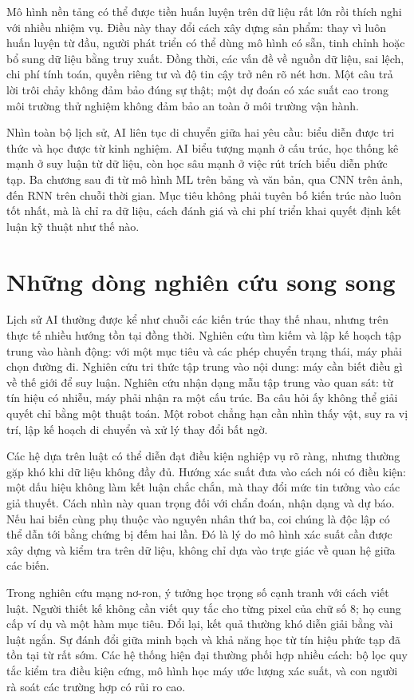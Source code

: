 \documentclass[12pt,a4paper]{report}
\begin{document}
Mô hình nền tảng có thể được tiền huấn luyện trên dữ liệu rất lớn rồi thích nghi với nhiều nhiệm vụ. Điều này thay đổi cách xây dựng sản phẩm: thay vì luôn huấn luyện từ đầu, người phát triển có thể dùng mô hình có sẵn, tinh chỉnh hoặc bổ sung dữ liệu bằng truy xuất. Đồng thời, các vấn đề về nguồn dữ liệu, sai lệch, chi phí tính toán, quyền riêng tư và độ tin cậy trở nên rõ nét hơn. Một câu trả lời trôi chảy không đảm bảo đúng sự thật; một dự đoán có xác suất cao trong môi trường thử nghiệm không đảm bảo an toàn ở môi trường vận hành.

Nhìn toàn bộ lịch sử, AI liên tục di chuyển giữa hai yêu cầu: biểu diễn được tri thức và học được từ kinh nghiệm. AI biểu tượng mạnh ở cấu trúc, học thống kê mạnh ở suy luận từ dữ liệu, còn học sâu mạnh ở việc rút trích biểu diễn phức tạp. Ba chương sau đi từ mô hình ML trên bảng và văn bản, qua CNN trên ảnh, đến RNN trên chuỗi thời gian. Mục tiêu không phải tuyên bố kiến trúc nào luôn tốt nhất, mà là chỉ ra dữ liệu, cách đánh giá và chi phí triển khai quyết định kết luận kỹ thuật như thế nào.

\section{Những dòng nghiên cứu song song}
Lịch sử AI thường được kể như chuỗi các kiến trúc thay thế nhau, nhưng trên thực tế nhiều hướng tồn tại đồng thời. Nghiên cứu tìm kiếm và lập kế hoạch tập trung vào hành động: với một mục tiêu và các phép chuyển trạng thái, máy phải chọn đường đi. Nghiên cứu tri thức tập trung vào nội dung: máy cần biết điều gì về thế giới để suy luận. Nghiên cứu nhận dạng mẫu tập trung vào quan sát: từ tín hiệu có nhiễu, máy phải nhận ra một cấu trúc. Ba câu hỏi ấy không thể giải quyết chỉ bằng một thuật toán. Một robot chẳng hạn cần nhìn thấy vật, suy ra vị trí, lập kế hoạch di chuyển và xử lý thay đổi bất ngờ.

Các hệ dựa trên luật có thể diễn đạt điều kiện nghiệp vụ rõ ràng, nhưng thường gặp khó khi dữ liệu không đầy đủ. Hướng xác suất đưa vào cách nói có điều kiện: một dấu hiệu không làm kết luận chắc chắn, mà thay đổi mức tin tưởng vào các giả thuyết. Cách nhìn này quan trọng đối với chẩn đoán, nhận dạng và dự báo. Nếu hai biến cùng phụ thuộc vào nguyên nhân thứ ba, coi chúng là độc lập có thể dẫn tới bằng chứng bị đếm hai lần. Đó là lý do mô hình xác suất cần được xây dựng và kiểm tra trên dữ liệu, không chỉ dựa vào trực giác về quan hệ giữa các biến.

Trong nghiên cứu mạng nơ-ron, ý tưởng học trọng số cạnh tranh với cách viết luật. Người thiết kế không cần viết quy tắc cho từng pixel của chữ số 8; họ cung cấp ví dụ và một hàm mục tiêu. Đổi lại, kết quả thường khó diễn giải bằng vài luật ngắn. Sự đánh đổi giữa minh bạch và khả năng học từ tín hiệu phức tạp đã tồn tại từ rất sớm. Các hệ thống hiện đại thường phối hợp nhiều cách: bộ lọc quy tắc kiểm tra điều kiện cứng, mô hình học máy ước lượng xác suất, và con người rà soát các trường hợp có rủi ro cao.
\end{document}
